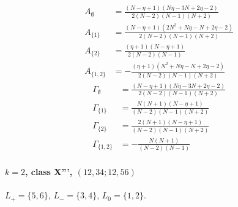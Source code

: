 \documentclass[11pt]{article}
\begin{document}
\begin{align*}
  A_{\emptyset} &= \frac{\left(N - \eta + 1\right) \left(N \eta - 3 N + 2 \eta - 2\right)}{2 \left(N - 2\right) \left(N - 1\right) \left(N + 2\right)} \\
  A_{\{1\}} &= \frac{\left(N - \eta + 1\right) \left(2 N^{2} + N \eta - N + 2 \eta - 2\right)}{2 \left(N - 2\right) \left(N - 1\right) \left(N + 2\right)} \\
  A_{\{2\}} &= \frac{\left(\eta + 1\right) \left(N - \eta + 1\right)}{2 \left(N - 2\right) \left(N - 1\right)} \\
  A_{\{1,2\}} &= - \frac{\left(\eta + 1\right) \left(N^{2} + N \eta - N + 2 \eta - 2\right)}{2 \left(N - 2\right) \left(N - 1\right) \left(N + 2\right)} 
\end{align*}
\begin{align*}
  \Gamma_{\emptyset} &= \frac{\left(N - \eta + 1\right) \left(N \eta - 3 N + 2 \eta - 2\right)}{2 \left(N - 2\right) \left(N - 1\right) \left(N + 2\right)} \\
  \Gamma_{\{1\}} &= \frac{N \left(N + 1\right) \left(N - \eta + 1\right)}{\left(N - 2\right) \left(N - 1\right) \left(N + 2\right)} \\
  \Gamma_{\{2\}} &= \frac{2 \left(N + 1\right) \left(N - \eta + 1\right)}{\left(N - 2\right) \left(N - 1\right) \left(N + 2\right)} \\
  \Gamma_{\{1,2\}} &= - \frac{N \left(N + 1\right)}{\left(N - 2\right) \left(N - 1\right)} 
\end{align*}

\paragraph{$k=2$, class X''', $(12,34;12,56)$}

$L_+=\{5,6\}$, $L_-=\{3,4\}$, $L_0=\{1,2\}$.
\end{document}
